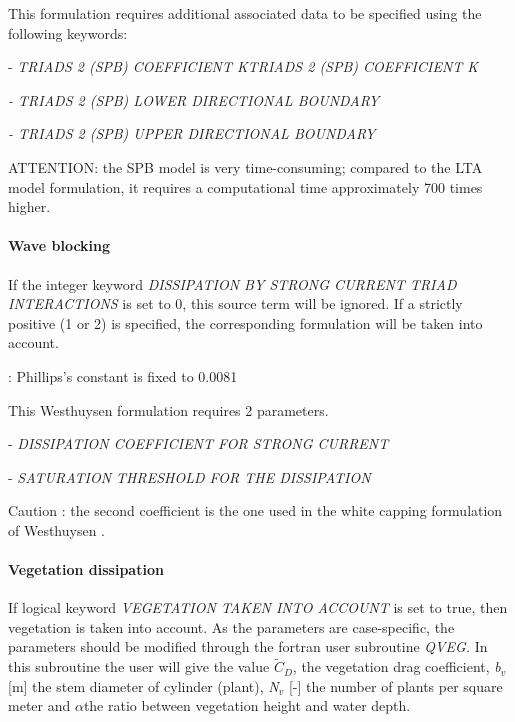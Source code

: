  \textbf{}

 This formulation requires additional associated data to be specified using the following keywords:

 - \textit{TRIADS 2 (SPB) COEFFICIENT KTRIADS 2 (SPB) COEFFICIENT K}

 \textit{- TRIADS 2 (SPB) LOWER DIRECTIONAL BOUNDARY}

 \textit{- TRIADS 2 (SPB) UPPER DIRECTIONAL BOUNDARY}

 ATTENTION: the SPB model is very time-consuming; compared to the LTA model formulation, it requires a computational time approximately 700 times higher.


\paragraph{ Wave blocking }

 If the integer keyword \textit{DISSIPATION BY STRONG CURRENT TRIAD INTERACTIONS} is set to 0, this source term will be ignored. If a strictly positive (1 or 2) is specified, the corresponding formulation will be taken into account.

 \textbf{} : Phillips's constant is fixed to 0.0081

 \textbf{}

 This Westhuysen formulation requires 2 parameters.

 - \textit{DISSIPATION COEFFICIENT FOR STRONG CURRENT}

 - \textit{SATURATION THRESHOLD FOR THE DISSIPATION}

 Caution : the second coefficient is the one used in the white capping formulation of Westhuysen \cite{Westhuys2008}.


\paragraph{ Vegetation dissipation}

 If logical keyword \textit{VEGETATION TAKEN INTO ACCOUNT} is set to true, then vegetation is taken into account. As the parameters are case-specific, the parameters should be modified through the fortran user subroutine \textit{QVEG. }In this subroutine the user will give the value $\tilde{C}_{D} $, the vegetation drag coefficient, \textit{b${}_{v}$} [m] the stem diameter of cylinder (plant), \textit{N${}_{v}$} [-] the number of plants per square meter and $\alpha $the ratio between vegetation height and water depth.


